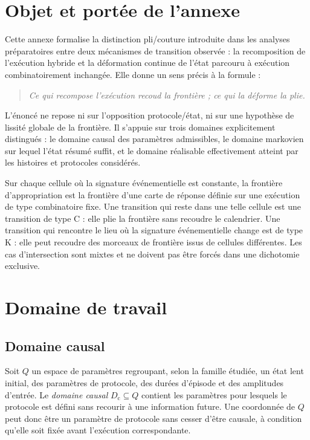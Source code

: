\section{Objet et portée de l'annexe}
\label{annexe-J-objet}

Cette annexe formalise la distinction pli/couture introduite dans les analyses préparatoires entre deux
mécanismes de transition observée : la recomposition de l'exécution
hybride et la déformation continue de l'état parcouru à exécution
combinatoirement inchangée. Elle donne un sens précis à la formule :
\begin{quote}
\emph{Ce qui recompose l'exécution recoud la frontière ; ce qui la
déforme la plie.}
\end{quote}

L'énoncé ne repose ni sur l'opposition protocole/état, ni sur une
hypothèse de lissité globale de la frontière. Il s'appuie sur trois
domaines explicitement distingués : le domaine causal des paramètres
admissibles, le domaine markovien sur lequel l'état résumé suffit, et le
domaine réalisable effectivement atteint par les histoires et protocoles
considérés.

\begin{encadre}[title={Résultat directeur}]
Sur chaque cellule où la signature événementielle est constante, la
frontière d'appropriation est la frontière d'une carte de réponse définie
sur une exécution de type combinatoire fixe. Une transition qui reste
dans une telle cellule est une transition de type C : elle plie la
frontière sans recoudre le calendrier. Une transition qui rencontre le
lieu où la signature événementielle change est de type K : elle peut
recoudre des morceaux de frontière issus de cellules différentes. Les
cas d'intersection sont mixtes et ne doivent pas être forcés dans une
dichotomie exclusive.
\end{encadre}

\section{Domaine de travail}
\label{annexe-J-domaines}

\subsection{Domaine causal}

Soit $Q$ un espace de paramètres regroupant, selon la famille étudiée,
un état lent initial, des paramètres de protocole, des durées d'épisode
et des amplitudes d'entrée. Le \emph{domaine causal} $D_{\mathrm c}\subseteq
Q$ contient les paramètres pour lesquels le protocole est défini sans
recourir à une information future. Une coordonnée de $Q$ peut donc être
un paramètre de protocole sans cesser d'être causale, à condition qu'elle
soit fixée avant l'exécution correspondante.

